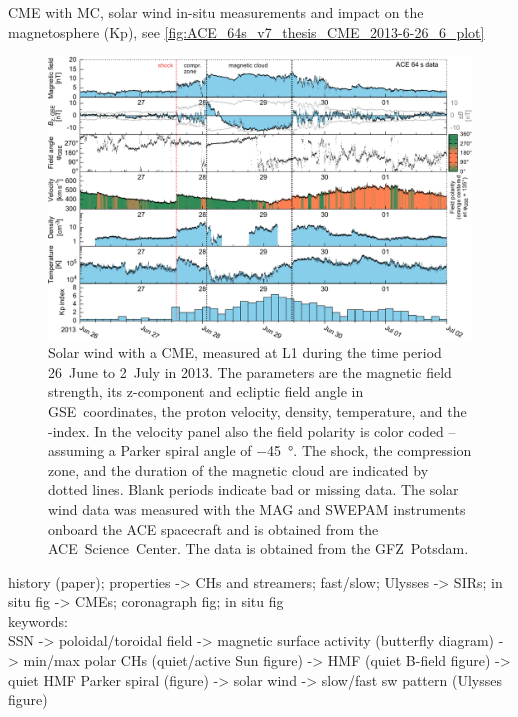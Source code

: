 CME with MC, solar wind in-situ measurements and impact on the magnetosphere (Kp), see \autoref{fig:ACE_64s_v7_thesis_CME_2013-6-26_6_plot}\\
\begin{figure}[htb]
	\centering
	\includegraphics[width=\textwidth]{images/gnuplots/ACE_64s_v7_thesis_CME_2013-6-26_6_plot.pdf}
	\caption{Solar wind with a CME, measured at L1 during the time period 26~June to 2~July in 2013. The parameters are the magnetic field strength, its z-component and ecliptic field angle in GSE~coordinates, the proton velocity, density, temperature, and the \Kp-index. In the velocity panel also the field polarity is color coded -- assuming a Parker spiral angle of \SI{-45}{\degree}. The shock, the compression zone, and the duration of the magnetic cloud are indicated by dotted lines. Blank periods indicate bad or missing data. The solar wind data was measured with the MAG and SWEPAM instruments onboard the ACE spacecraft and is obtained from the ACE~Science~Center. The \Kp{} data is obtained from the GFZ~Potsdam.}
	\label{fig:ACE_64s_v7_thesis_CME_2013-6-26_6_plot}
\end{figure}



history (paper); properties -> CHs and streamers; fast/slow; Ulysses -> SIRs; in situ fig -> CMEs; coronagraph fig; in situ fig\\

keywords:\\
SSN -> poloidal/toroidal field -> magnetic surface activity (butterfly diagram) -> min/max polar CHs (quiet/active Sun figure) -> HMF (quiet B-field figure) -> quiet HMF Parker spiral (figure) -> solar wind -> slow/fast sw pattern (Ulysses figure)\\



